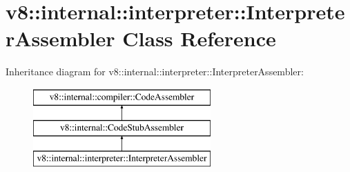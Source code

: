 \hypertarget{classv8_1_1internal_1_1interpreter_1_1_interpreter_assembler}{}\section{v8\+:\+:internal\+:\+:interpreter\+:\+:Interpreter\+Assembler Class Reference}
\label{classv8_1_1internal_1_1interpreter_1_1_interpreter_assembler}
Inheritance diagram for v8\+:\+:internal\+:\+:interpreter\+:\+:Interpreter\+Assembler\+:\begin{figure}[H]
\begin{center}
\leavevmode
\includegraphics[height=3.000000cm]{classv8_1_1internal_1_1interpreter_1_1_interpreter_assembler}
\end{center}
\end{figure}
